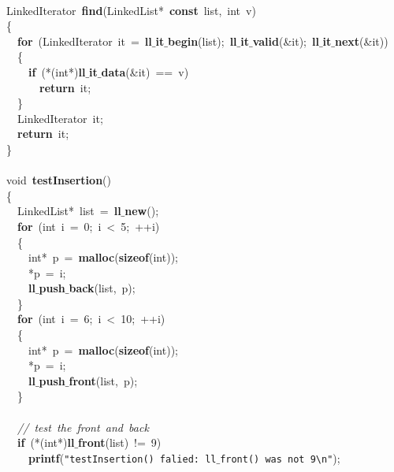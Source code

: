 \documentclass{article}
\begin{document}
\mbox{} \\
\mbox{}LinkedIterator\ \textbf{find}(LinkedList*\ \textbf{const}\ list,\ int\ v) \\
\mbox{}\{ \\
\mbox{}\ \ \textbf{for}\ (LinkedIterator\ it\ =\ \textbf{ll$\_$it$\_$begin}(list);\ \textbf{ll$\_$it$\_$valid}(\&it);\ \textbf{ll$\_$it$\_$next}(\&it)) \\
\mbox{}\ \ \{ \\
\mbox{}\ \ \ \ \textbf{if}\ (*(int*)\textbf{ll$\_$it$\_$data}(\&it)\ ==\ v) \\
\mbox{}\ \ \ \ \ \ \textbf{return}\ it; \\
\mbox{}\ \ \} \\
\mbox{}\ \ LinkedIterator\ it; \\
\mbox{}\ \ \textbf{return}\ it; \\
\mbox{}\} \\
\mbox{} \\
\mbox{}void\ \textbf{testInsertion}() \\
\mbox{}\{ \\
\mbox{}\ \ LinkedList*\ list\ =\ \textbf{ll$\_$new}(); \\
\mbox{}\ \ \textbf{for}\ (int\ i\ =\ 0;\ i\ \textless{}\ 5;\ ++i) \\
\mbox{}\ \ \{ \\
\mbox{}\ \ \ \ int*\ p\ =\ \textbf{malloc}(\textbf{sizeof}(int)); \\
\mbox{}\ \ \ \ *p\ =\ i; \\
\mbox{}\ \ \ \ \textbf{ll$\_$push$\_$back}(list,\ p); \\
\mbox{}\ \ \} \\
\mbox{}\ \ \textbf{for}\ (int\ i\ =\ 6;\ i\ \textless{}\ 10;\ ++i) \\
\mbox{}\ \ \{ \\
\mbox{}\ \ \ \ int*\ p\ =\ \textbf{malloc}(\textbf{sizeof}(int)); \\
\mbox{}\ \ \ \ *p\ =\ i; \\
\mbox{}\ \ \ \ \textbf{ll$\_$push$\_$front}(list,\ p); \\
\mbox{}\ \ \} \\
\mbox{} \\
\mbox{}\ \ \textit{//\ test\ the\ front\ and\ back} \\
\mbox{}\ \ \textbf{if}\ (*(int*)\textbf{ll$\_$front}(list)\ !=\ 9) \\
\mbox{}\ \ \ \ \textbf{printf}(\texttt{"{}testInsertion()\ falied:\ ll$\_$front()\ was\ not\ 9}\texttt{\textbackslash{}n}\texttt{"{}}); \\
\end{document}
